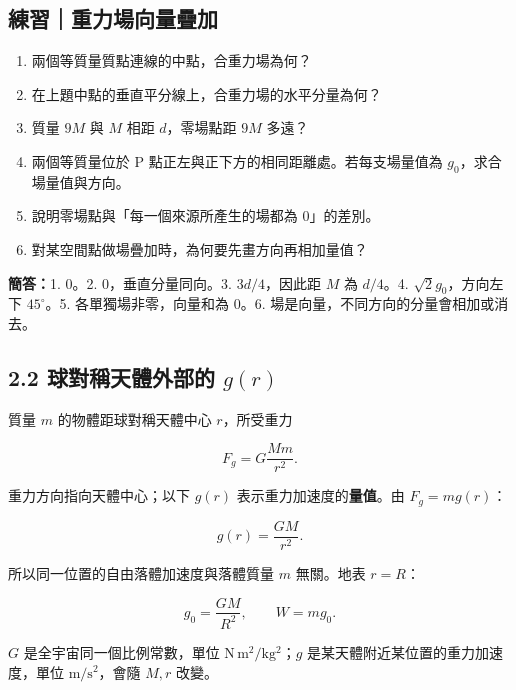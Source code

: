 \documentclass[11pt,a4paper]{article}
\providecommand{\tightlist}{%
  \setlength{\itemsep}{0pt}\setlength{\parskip}{0pt}}
\begin{document}
\begin{HandoutSelfCheck}

\subsection{練習｜重力場向量疊加}\label{ux7df4ux7fd2ux91cdux529bux5834ux5411ux91cfux758aux52a0}

\begin{enumerate}
\def\labelenumi{\arabic{enumi}.}
\tightlist
\item
  兩個等質量質點連線的中點，合重力場為何？
\item
  在上題中點的垂直平分線上，合重力場的水平分量為何？
\item
  質量 \(9M\) 與 \(M\) 相距 \(d\)，零場點距 \(9M\) 多遠？
\item
  兩個等質量位於 P 點正左與正下方的相同距離處。若每支場量值為 \(g_0\)，求合場量值與方向。
\item
  說明零場點與「每一個來源所產生的場都為 0」的差別。
\item
  對某空間點做場疊加時，為何要先畫方向再相加量值？
\end{enumerate}

\textbf{簡答：}1. 0。2. 0，垂直分量同向。3. \(3d/4\)，因此距 \(M\) 為 \(d/4\)。4. \(\sqrt2g_0\)，方向左下 \(45^\circ\)。5. 各單獨場非零，向量和為 0。6. 場是向量，不同方向的分量會相加或消去。

\end{HandoutSelfCheck}

\subsection{\texorpdfstring{2.2 球對稱天體外部的 \(g(r)\)}{2.2 球對稱天體外部的 g(r)}}\label{ux7403ux5c0dux7a31ux5929ux9ad4ux5916ux90e8ux7684-gr}

質量 \(m\) 的物體距球對稱天體中心 \(r\)，所受重力

\[
F_g=G\frac{Mm}{r^2}.
\]

重力方向指向天體中心；以下 \(g(r)\) 表示重力加速度的\textbf{量值}。由 \(F_g=mg(r)\)：

\[
\boxed{g(r)=\frac{GM}{r^2}}.
\]

所以同一位置的自由落體加速度與落體質量 \(m\) 無關。地表 \(r=R\)：

\[
g_0=\frac{GM}{R^2},
\qquad
W=mg_0.
\]

\(G\) 是全宇宙同一個比例常數，單位 \(\mathrm{N\,m^2/kg^2}\)；\(g\) 是某天體附近某位置的重力加速度，單位 \(\mathrm{m/s^2}\)，會隨 \(M,r\) 改變。
\end{document}
